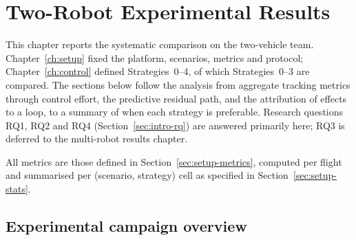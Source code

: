 %
%
%

\chapter{Two-Robot Experimental Results}
\label{ch:results2}

This chapter reports the systematic comparison on the two-vehicle team. Chapter~\ref{ch:setup}
fixed the platform, scenarios, metrics and protocol; Chapter~\ref{ch:control}
defined Strategies~0--4, of which Strategies~0--3 are compared. The sections below follow the analysis
from aggregate tracking metrics through control effort, the predictive residual path, and the
attribution of effects to a loop, to a summary of when each strategy is preferable. Research
questions RQ1, RQ2 and RQ4 (Section~\ref{sec:intro-rq}) are answered primarily here; RQ3 is
deferred to the multi-robot results chapter.

All metrics are those defined in Section~\ref{sec:setup-metrics}, computed per flight and summarised
per (scenario, strategy) cell as specified in Section~\ref{sec:setup-stats}.

\section{Experimental campaign overview}
\label{sec:res2-overview}

